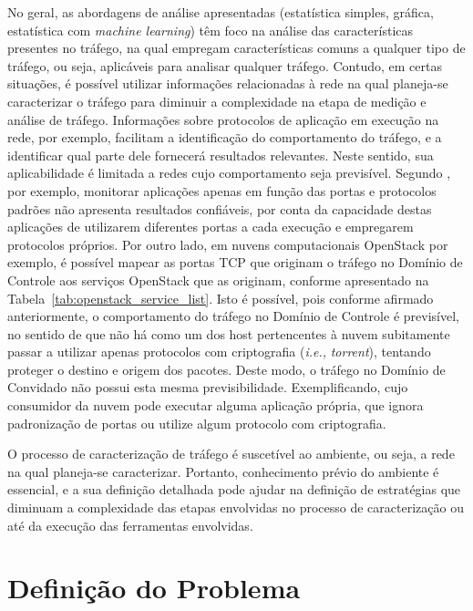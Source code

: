 No geral, as abordagens de análise apresentadas (estatística simples, gráfica, estatística com \textit{machine learning}) têm foco na análise das características presentes no tráfego, na qual empregam características comuns a qualquer tipo de tráfego, ou seja, aplicáveis para analisar qualquer tráfego.
%
Contudo, em certas situações, é possível utilizar informações relacionadas à rede na qual planeja-se caracterizar o tráfego para diminuir a complexidade na etapa de medição e análise de tráfego.
%
Informações sobre protocolos de aplicação em execução na rede, por exemplo, facilitam a identificação do comportamento do tráfego, e a identificar qual parte dele fornecerá resultados relevantes.
%
Neste sentido, sua aplicabilidade é limitada a redes cujo comportamento seja previsível.
%
Segundo , por exemplo, monitorar aplicações apenas em função das portas e protocolos padrões não apresenta resultados confiáveis, por conta da capacidade destas aplicações de utilizarem diferentes portas a cada execução e empregarem protocolos próprios.
%
Por outro lado, em nuvens computacionais OpenStack por exemplo, é possível mapear as portas TCP que originam o tráfego no Domínio de Controle aos serviços OpenStack que as originam, conforme apresentado na Tabela~\ref{tab:openstack_service_list}.
%
Isto é possível, pois conforme afirmado anteriormente, o comportamento do tráfego no Domínio de Controle é previsível, no sentido de que não há como um dos host pertencentes à nuvem subitamente passar a utilizar apenas protocolos com criptografia (\textit{i.e.,} \textit{torrent}), tentando proteger o destino e origem dos pacotes.
%
Deste modo, o tráfego no Domínio de Convidado não possui esta mesma previsibilidade. 
%
Exemplificando, cujo consumidor da nuvem pode executar alguma aplicação própria, que ignora padronização de portas ou utilize algum protocolo com criptografia.

O processo de caracterização de tráfego é suscetível ao ambiente, ou seja, a rede na qual planeja-se caracterizar.
%
Portanto, conhecimento prévio do ambiente é essencial, e a sua definição detalhada pode ajudar na definição de estratégias que diminuam a complexidade das etapas envolvidas no processo de caracterização ou até da execução das ferramentas envolvidas.


\section{Definição do Problema}
\label{cap2:problema}

